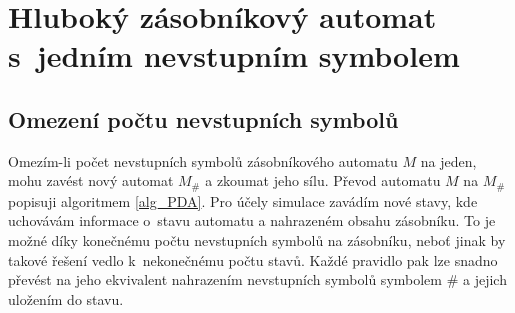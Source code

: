 

\chapter{Hluboký zásobníkový automat s~jedním nevstupním symbolem}


\section{Omezení počtu nevstupních symbolů}\label{section_deep_pda_nonterm}

Omezím-li počet nevstupních symbolů zásobníkového automatu $M$ na jeden, mohu zavést nový automat $M_\#$ a zkoumat jeho sílu. Převod automatu $M$ na  $M_\#$ popisuji algoritmem \ref{alg_PDA}. Pro účely simulace zavádím nové stavy, kde uchovávám informace o~stavu automatu a nahrazeném obsahu zásobníku. To je možné díky konečnému počtu nevstupních symbolů na zásobníku, neboť jinak by takové řešení vedlo k~nekonečnému počtu stavů. Každé pravidlo pak lze snadno převést na jeho ekvivalent nahrazením nevstupních symbolů symbolem $\#$ a jejich uložením do stavu.

